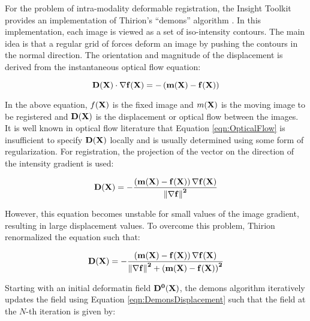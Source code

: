 %
%
%
%
%
%

For the problem of intra-modality deformable registration, the Insight
Toolkit provides an implementation of Thirion's ``demons'' algorithm
\cite{Thirion1995b,Thirion1998}. 
In this implementation, each image is viewed as a set of iso-intensity
contours.  The main idea is that a regular grid of forces deform an image by
pushing the contours in the normal direction.  The orientation and magnitude
of the displacement is derived from the instantaneous optical flow equation:

\begin{equation}
\bf{D}(\bf{X}) \cdot \nabla f(\bf{X}) = - \left(m(\bf{X}) - f(\bf{X}) \right)
\label{eqn:OpticalFlow}
\end{equation}

In the above equation, $f(\bf{X})$ is the fixed image and $m(\bf{X})$
is the moving image to be registered and $\bf{D}(\bf{X})$ is the displacement 
or optical flow between the images. It is well known in optical flow
literature that Equation \ref{eqn:OpticalFlow} is insufficient to specify 
$\bf{D}(\bf{X})$ locally and is usually determined using some form of
regularization. For registration, the projection of the vector on the
direction of the intensity gradient is used:

\begin{equation}
\bf{D}(\bf{X}) = - \frac
{\left(  m(\bf{X}) - f(\bf{X}) \right) \nabla f(\bf{X})}
{\left\|  \nabla f \right\|^2 } 
\end{equation}

However, this equation becomes unstable for small values of the image gradient,
resulting in large displacement values. To overcome this problem, Thirion
renormalized the equation such that:

\begin{equation}
\bf{D}(\bf{X}) = - \frac
{\left(  m(\bf{X}) - f(\bf{X}) \right) \nabla f(\bf{X})}
{\left\|  \nabla f \right\|^2 + \left(  m(\bf{X}) - f(\bf{X}) \right)^2 } 
\label{eqn:DemonsDisplacement}
\end{equation}

Starting with an initial deformatin field $\bf{D}^{0}(\bf{X})$, the demons
algorithm iteratively updates the field using Equation
\ref{eqn:DemonsDisplacement} such that the field at the $N$-th iteration is
given by:

